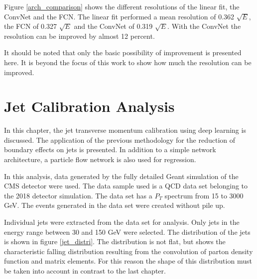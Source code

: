 \documentclass[12pt, a4paper]{thesis}
\begin{document}
Figure \ref{arch_comparison} shows the different resolutions of the
linear fit, the ConvNet and the FCN. The linear fit performed a mean
resolution of 0.362 $\sqrt{E}$, the FCN of 0.327 $\sqrt{E}$ and the
ConvNet of 0.319 $\sqrt{E}$. With the ConvNet the resolution can be
improved by almost 12 percent.

It should be noted that only the basic possibility of improvement is
presented here. It is beyond the focus of this work to show how much
the resolution can be improved.


\chapter{Jet Calibration Analysis}
\label{sec:org03a9b39}

In this chapter, the jet transverse momentum calibration using deep
learning is discussed. The application of the previous methodology for
the reduction of boundary effects on jets is presented. In addition to
a simple network architecture, a particle flow network is also used
for regression.

In this analysis, data generated by the fully detailed Geant
simulation of the CMS detector were used. The data sample used is a
QCD data set belonging to the 2018 detector simulation. The data set
has a \(P_T\) spectrum from 15 to 3000 GeV. The events generated in
the data set were created without pile up.

Individual jets were extracted from the data set for analysis. Only
jets in the energy range between 30 and 150 GeV were selected. The
distribution of the jets is shown in figure \ref{jet_distri}. The
distribution is not flat, but shows the characteristic falling
distribution resulting from the convolution of parton density function
and matrix elements. For this reason the shape of this distribution
must be taken into account in contrast to the last chapter.
\end{document}
